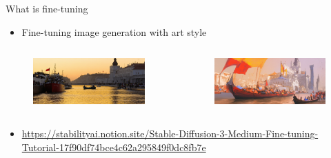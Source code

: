 \documentclass[aspectratio=169]{beamer}
\begin{document}
\begin{frame}{What is fine-tuning}
  \begin{itemize}
    \item Fine-tuning image generation with art style
  \end{itemize}
  \begin{columns}
    \begin{column}{0.4\textwidth}
      \begin{figure}
        \includegraphics[width = \textwidth]{images/ComfyUI_temp_efmpg_00043_.png}
      \end{figure}
    \end{column}
    \begin{column}{0.4\textwidth}
      \begin{figure}
        \includegraphics[width = \textwidth]{images/ComfyUI_temp_zzlix_00045_.png}
      \end{figure}
    \end{column}
  \end{columns}
  \begin{itemize}
    \item \footnotesize\url{https://stabilityai.notion.site/Stable-Diffusion-3-Medium-Fine-tuning-Tutorial-17f90df74bce4c62a295849f0dc8fb7e}
  \end{itemize}
  
\end{frame}
\end{document}
